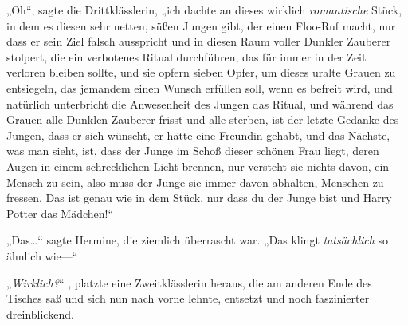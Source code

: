 „Oh“, sagte die Drittklässlerin, „ich dachte an dieses wirklich \emph{romantische} Stück, in dem es diesen sehr netten, süßen Jungen gibt, der einen Floo-Ruf macht, nur dass er sein Ziel falsch ausspricht und in diesen Raum voller Dunkler Zauberer stolpert, die ein verbotenes Ritual durchführen, das für immer in der Zeit verloren bleiben sollte, und sie opfern sieben Opfer, um dieses uralte Grauen zu entsiegeln, das jemandem einen Wunsch erfüllen soll, wenn es befreit wird, und natürlich unterbricht die Anwesenheit des Jungen das Ritual, und während das Grauen alle Dunklen Zauberer frisst und alle sterben, ist der letzte Gedanke des Jungen, dass er sich wünscht, er hätte eine Freundin gehabt, und das Nächste, was man sieht, ist, dass der Junge im Schoß dieser schönen Frau liegt, deren Augen in einem schrecklichen Licht brennen, nur versteht sie nichts davon, ein Mensch zu sein, also muss der Junge sie immer davon abhalten, Menschen zu fressen. Das ist genau wie in dem Stück, nur dass du der Junge bist und Harry Potter das Mädchen!“

„Das…“ sagte Hermine, die ziemlich überrascht war. „Das klingt \emph{tatsächlich} so ähnlich wie—“

„\emph{Wirklich?}“ , platzte eine Zweitklässlerin heraus, die am anderen Ende des Tisches saß und sich nun nach vorne lehnte, entsetzt und noch faszinierter dreinblickend.


